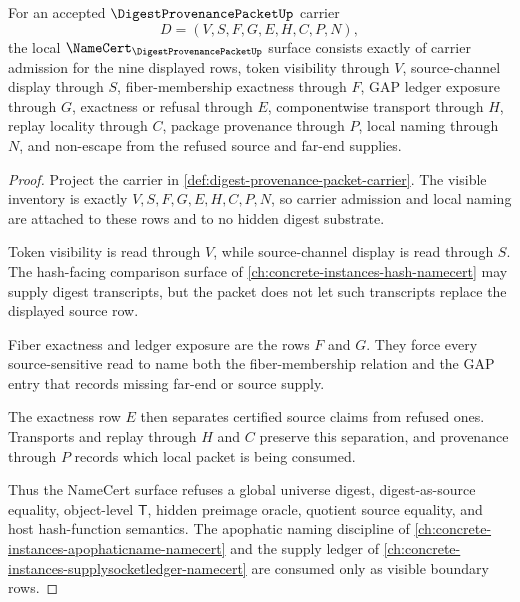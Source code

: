 \begin{theorem}
\label{thm:digest-provenance-packet-namecert-obligations}
For an accepted $\DigestProvenancePacketUp$ carrier
$$
D=(V,S,F,G,E,H,C,P,N),
$$
the local $\NameCert_{\DigestProvenancePacketUp}$ surface consists exactly of carrier admission for the nine displayed rows, token visibility through $V$, source-channel display through $S$, fiber-membership exactness through $F$, GAP ledger exposure through $G$, exactness or refusal through $E$, componentwise transport through $H$, replay locality through $C$, package provenance through $P$, local naming through $N$, and non-escape from the refused source and far-end supplies.
\end{theorem}
\begin{proof}
Project the carrier in \autoref{def:digest-provenance-packet-carrier}. The visible inventory is exactly $V,S,F,G,E,H,C,P,N$, so carrier admission and local naming are attached to these rows and to no hidden digest substrate.

Token visibility is read through $V$, while source-channel display is read through $S$. The hash-facing comparison surface of \autoref{ch:concrete-instances-hash-namecert} may supply digest transcripts, but the packet does not let such transcripts replace the displayed source row.

Fiber exactness and ledger exposure are the rows $F$ and $G$. They force every source-sensitive read to name both the fiber-membership relation and the GAP entry that records missing far-end or source supply.

The exactness row $E$ then separates certified source claims from refused ones. Transports and replay through $H$ and $C$ preserve this separation, and provenance through $P$ records which local packet is being consumed.

Thus the NameCert surface refuses a global universe digest, digest-as-source equality, object-level $\mathsf{T}$, hidden preimage oracle, quotient source equality, and host hash-function semantics. The apophatic naming discipline of \autoref{ch:concrete-instances-apophaticname-namecert} and the supply ledger of \autoref{ch:concrete-instances-supplysocketledger-namecert} are consumed only as visible boundary rows.
\end{proof}

